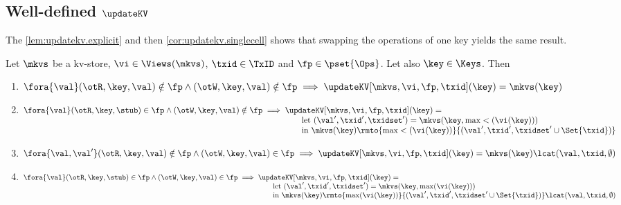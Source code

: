 \subsection{Well-defined \( \updateKV \)}
\label{sec:updatekv-well-defined}
The \cref{lem:updatekv.explicit} and then \cref{cor:updatekv.singlecell} shows that
swapping the operations of one key yields the same result.

\begin{lemma}
\label{lem:updatekv.explicit}
Let $\mkvs$ be a kv-store, $\vi \in \Views(\mkvs)$, $\txid \in \TxID$ and $\fp \in \pset{\Ops}$. 
Let also $\key \in \Keys$. Then
\begin{enumerate}
    \item\label{item:updatekv.explicit.none} 
        $\fora{\val} (\otR, \key, \val) \notin \fp \land (\otW, \key, \val) \notin \fp \implies \updateKV[\mkvs, \vi, \fp, \txid](\key) = \mkvs(\key)$
\item\label{item:updatekv.explicit.rd} 
    $\fora{\val} (\otR, \key, \stub) \in \fp \land (\otW, \key, \val) \notin \fp 
    \implies 
    \begin{array}[t]{@{}l@{}}
    \updateKV[\mkvs, \vi, \fp, \txid](\key) = \\
    \qquad \text{let} \ (\val', \txid', \txidset') = \mkvs(\key, \max<(\vi(\key))) \\
    \qquad \text{in} \ \mkvs(\key)\rmto{\max<(\vi(\key))}{(\val', \txid', \txidset' \cup \Set{\txid})}
    \end{array}
    $
\item\label{item:updatekv.explicit.wr} 
    $
    \begin{array}[t]{@{}l@{}}
    \fora{ \val, \val'}(\otR, \key, \val) \notin \fp \land (\otW, \key, \val) \in \fp 
    \implies \updateKV[\mkvs, \vi, \fp, \txid](\key) = \mkvs(\key) \lcat (\val, \txid, \emptyset)
    \end{array}
    $
\item\label{item:updatekv.explicit.rdwr}
    $
    \fora{\val} (\otR, \key, \stub) \in \fp \land (\otW, \key, \val) \in \fp 
    \implies 
    \begin{array}[t]{@{}l@{}}
    \updateKV[\mkvs,\vi,\fp,\txid](\key) =  \\
    \qquad \text{let} \ (\val', \txid', \txidset') = \mkvs(\key, \max(\vi(\key)))  \\
    \qquad \text{in} \ \mkvs(\key)\rmto{\max(\vi(\key))}{(\val', \txid', \txidset' \cup \Set{\txid}) } \lcat (\val, \txid, \emptyset)
    \end{array}
    $
\end{enumerate}
\end{lemma}

